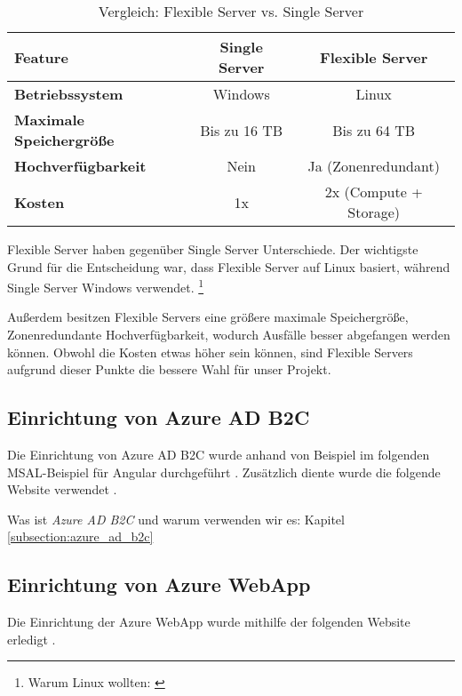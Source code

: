 \begin{table}[h t]
    \centering
    \caption{Vergleich: Flexible Server vs. Single Server}
    \label{tab:azure-postgresql}
    \begin{tabular}{lcc}
    \hline
    \textbf{Feature}                & \textbf{Single Server} & \textbf{Flexible Server} \\ \hline
    \textbf{Betriebssystem}         & Windows                & Linux                    \\
    \textbf{Maximale Speichergrö\ss{}e} & Bis zu 16 TB           & Bis zu 64 TB             \\
    \textbf{Hochverfügbarkeit}      & Nein                   & Ja (Zonenredundant)      \\
    \textbf{Kosten}                 & 1x                     & 2x (Compute + Storage)   \\ \hline
    \end{tabular}
\end{table}

Flexible Server haben gegenüber Single Server Unterschiede. 
Der wichtigste Grund für die Entscheidung war, dass Flexible Server auf Linux basiert, 
während Single Server Windows verwendet. \footnote{Warum Linux wollten: \cite{hussain2015survey}}

Au\ss{}erdem besitzen Flexible Servers eine grö\ss{}ere maximale Speichergrö\ss{}e, Zonenredundante Hochverfügbarkeit, 
wodurch Ausfälle besser abgefangen werden können. Obwohl die Kosten etwas höher sein können, 
sind Flexible Servers aufgrund dieser Punkte die bessere Wahl für unser Projekt.

\subsection{Einrichtung von Azure AD B2C}

Die Einrichtung von Azure AD B2C wurde anhand von Beispiel im folgenden MSAL-Beispiel
für Angular durchgeführt \cite{MicrosoftCorporationh}. Zusätzlich diente wurde die folgende
Website verwendet \cite{MicrosoftCorporationg}.

Was ist \emph{Azure AD B2C} und warum verwenden wir es: Kapitel \ref{subsection:azure_ad_b2c}

\subsection{Einrichtung von Azure WebApp}

Die Einrichtung der Azure WebApp wurde mithilfe der folgenden Website erledigt 
\cite{MicrosoftCorporationi}.

